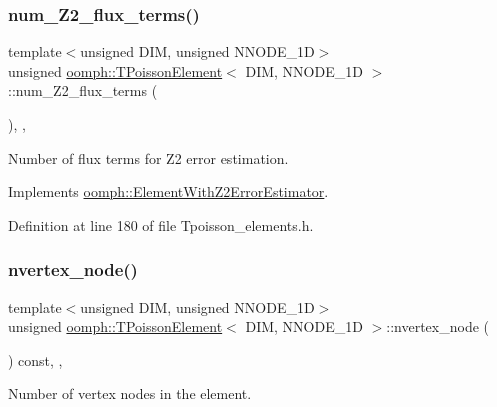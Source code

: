 \subsubsection{\texorpdfstring{num\+\_\+\+Z2\+\_\+flux\+\_\+terms()}{num\_Z2\_flux\_terms()}}
{\footnotesize\ttfamily template$<$unsigned D\+IM, unsigned N\+N\+O\+D\+E\+\_\+1D$>$ \\
unsigned \hyperlink{classoomph_1_1TPoissonElement}{oomph\+::\+T\+Poisson\+Element}$<$ D\+IM, N\+N\+O\+D\+E\+\_\+1D $>$\+::num\+\_\+\+Z2\+\_\+flux\+\_\+terms (\begin{DoxyParamCaption}{ }\end{DoxyParamCaption})\hspace{0.3cm}{\ttfamily [inline]}, {\ttfamily [protected]}, {\ttfamily [virtual]}}



Number of \textquotesingle{}flux\textquotesingle{} terms for Z2 error estimation. 



Implements \hyperlink{classoomph_1_1ElementWithZ2ErrorEstimator_ae82c5728902e13da31be19c390fc28e3}{oomph\+::\+Element\+With\+Z2\+Error\+Estimator}.



Definition at line 180 of file Tpoisson\+\_\+elements.\+h.

\mbox{\label{classoomph_1_1TPoissonElement_a86423f2dcb0bf2a440036ad0128a8bc6}} 
\subsubsection{\texorpdfstring{nvertex\+\_\+node()}{nvertex\_node()}}
{\footnotesize\ttfamily template$<$unsigned D\+IM, unsigned N\+N\+O\+D\+E\+\_\+1D$>$ \\
unsigned \hyperlink{classoomph_1_1TPoissonElement}{oomph\+::\+T\+Poisson\+Element}$<$ D\+IM, N\+N\+O\+D\+E\+\_\+1D $>$\+::nvertex\+\_\+node (\begin{DoxyParamCaption}{ }\end{DoxyParamCaption}) const\hspace{0.3cm}{\ttfamily [inline]}, {\ttfamily [protected]}, {\ttfamily [virtual]}}



Number of vertex nodes in the element. 



